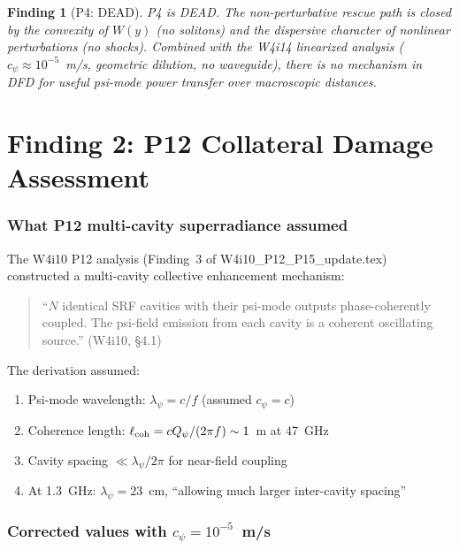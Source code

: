 \documentclass[11pt]{article}
\newtheorem{finding}{Finding}
\newcommand{\Qpsi}{Q_\psi}
\begin{document}
\begin{finding}[P4: DEAD]
\label{find:dead}
P4 is DEAD. The non-perturbative rescue path is closed by the convexity
of $W(y)$ (no solitons) and the dispersive character of nonlinear
perturbations (no shocks). Combined with the W4i14 linearized analysis
($c_\psi \approx 10^{-5}$~m/s, geometric dilution, no waveguide),
there is no mechanism in DFD for useful psi-mode power transfer over
macroscopic distances.
\end{finding}


\part{Finding 2: P12 Collateral Damage Assessment}
\label{part:p12}

\section{What P12 multi-cavity superradiance assumed}

The W4i10 P12 analysis (Finding~3 of W4i10\_P12\_P15\_update.tex)
constructed a multi-cavity collective enhancement mechanism:
\begin{quote}
``$N$ identical SRF cavities with their psi-mode outputs phase-coherently
coupled. The psi-field emission from each cavity is a coherent oscillating
source.'' (W4i10, \S4.1)
\end{quote}

The derivation assumed:
\begin{enumerate}[nosep]
\item Psi-mode wavelength: $\lambda_\psi = c/f$ (assumed $c_\psi = c$)
\item Coherence length: $\ell_{\rm coh} = c\Qpsi/(2\pi f) \sim 1$~m at 47~GHz
\item Cavity spacing $\ll \lambda_\psi/2\pi$ for near-field coupling
\item At 1.3~GHz: $\lambda_\psi = 23$~cm, ``allowing much larger inter-cavity spacing''
\end{enumerate}

\section{Corrected values with $c_\psi = 10^{-5}$~m/s}
\end{document}
